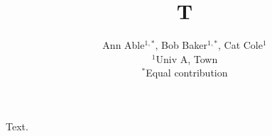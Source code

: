 \documentclass{article}
\title{T}
\author{Ann Able$^{1,*}$, Bob Baker$^{1,*}$, Cat Cole$^{1}$\\ $^1$Univ A, Town\\ $^*$Equal contribution}
\date{}
\begin{document}
\maketitle
Text.
\end{document}
